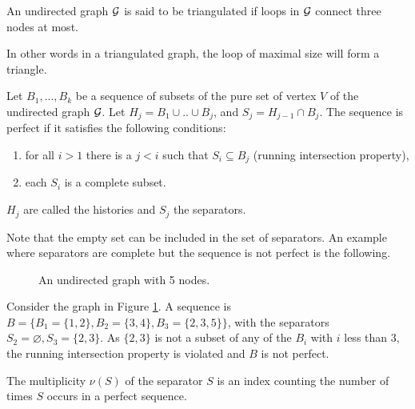  \begin{definition}
 An undirected graph $\mathcal{G}$ is said to be triangulated if loops in $\mathcal{G}$ connect three nodes at most.
 \end{definition} 
 In other words in a triangulated graph, the loop of maximal size will form a triangle.
 \begin{definition}
 Let $B_1,...,B_k$ be a sequence of subsets of the pure set of vertex $V$ of the undirected graph $\mathcal{G}$. Let $H_j=B_1\cup .. \cup B_j$, and $S_j = H_{j-1} \cap B_j$. The sequence is perfect if it satisfies the following conditions:
 \begin{enumerate}[label=(\roman*)]
 \item for all $i>1$ there is a $j<i$ such that $S_i \subseteq B_j$ (running intersection property),
 \item each $S_i$ is a complete subset.
 \end{enumerate}
 $H_j$ are called the histories and $S_j$ the separators.
 \end{definition}
Note that the empty set can be included in the set of separators. An example where separators are complete but the sequence is not perfect is the following.
\begin{figure}[H]
 \begin{center}
 \caption{An undirected graph with 5 nodes.}
  \label{ex:graph1}
    \end{center}
\end{figure}
Consider the graph in Figure \ref{ex:graph1}. A sequence is $B=\big\{B_1=\{1,2\}, B_2=\{3,4\},B_3=\{2,3,5\}\big\}$, with the separators $S_2=\varnothing, S_3=\{2,3\}$. As $\{2,3\}$ is not a subset of any of the $B_i$ with $i$ less than 3, the running intersection property is violated and $B$ is not perfect.
 \begin{definition}
 The multiplicity $\nu (S)$ of the separator $S$ is an index counting the number of times $S$ occurs in a perfect sequence.
 \end{definition}
 
